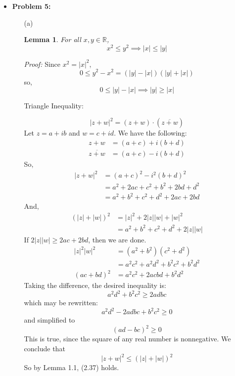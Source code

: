 \documentclass[12pt]{amsart}
\newtheorem{lemma}[theorem]{Lemma}
\theoremstyle{definition}
\theoremstyle{remark}
\begin{document}
\begin{itemize}
\begin{itemize}
\end{itemize}

\vspace{0.2 cm}

\item {\bf{Problem 5:}} 

\begin{itemize}
\item[(a)]


\begin{lemma}
For all $x,y\in \mathbb{R}$, $$x^{2}\le y^{2}\implies |x|\le |y|$$
\end{lemma}

\textit{Proof:}
Since $x^{2}=|x|^{2}$, 
$$0\le y^{2}-x^{2}=(|y|-|x|)(|y|+|x|)$$so, $$0\le|y|-|x|\implies |y|\ge|x|$$ 


Triangle Inequality:

$$|z+w|^{2}=(z+w)\cdot(\overline{z+w})$$
Let $z=a+ib$ and $w=c+id$. We have the following: \begin{align*}z+w&= (a+c)+i(b+d)\\
\overline{z+w}&= (a+c)-i(b+d)\end{align*}
So, \begin{align*}
|z+w|^{2}&= (a+c)^{2}-i^{2}(b+d)^{2}\\
&= a^{2}+2ac+c^{2}+b^{2}+2bd+d^{2}\\
&= a^{2}+b^{2}+c^{2}+d^{2}+2ac+2bd
\end{align*}And, \begin{align*}(|z|+|w|)^{2}&= |z|^{2}+2|z||w|+|w|^{2}\\
&= a^{2}+b^{2}+c^{2}+d^{2}+2|z||w|
\end{align*}
If $2|z||w|\ge2ac+2bd$, then we are done. \begin{align*}
|z|^{2}|w|^{2}&= (a^{2}+b^{2})(c^{2}+d^{2})\\
&= a^{2}c^{2}+a^{2}d^{2}+b^{2}c^{2}+b^{2}d^{2}\\
(ac+bd)^{2}&= a^{2}c^{2}+2acbd+b^{2}d^{2}
\end{align*}Taking the difference, the desired inequality is:
$$a^{2}d^{2}+b^{2}c^{2}\ge 2adbc$$which may be rewritten:
$$a^{2}d^{2}-2adbc+b^{2}c^{2}\ge0$$
and simplified to
$$(ad-bc)^{2}\ge0$$
This is true, since the square of any real number is nonnegative. We conclude that $$|z+w|^{2}\le(|z|+|w|)^{2}$$So by Lemma 1.1, (2.37) holds.




\vspace{0.1 cm}

\end{itemize}

\end{itemize}
\end{document}

